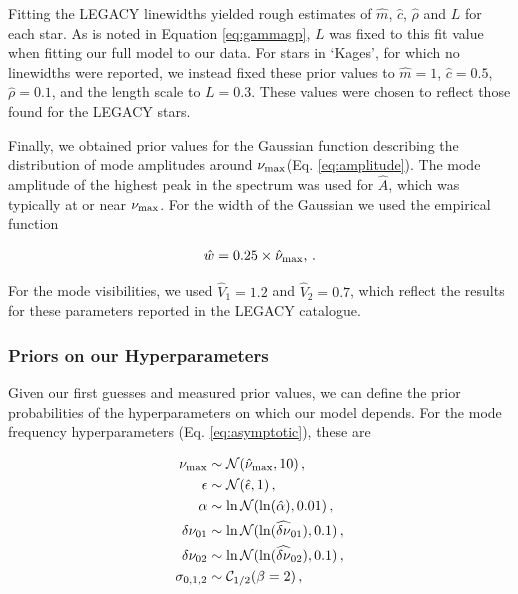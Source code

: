 \documentclass[12pt]{article}
\newcommand{\numax}{\mbox{$\nu_{\rm max}$}\xspace}
\begin{document}
Fitting the LEGACY linewidths yielded rough estimates of $\hat{m}$, $\hat{c}$, $\hat{\rho}$ and $L$ for each star. As is noted in Equation \ref{eq:gammagp}, $L$ was fixed to this fit value when fitting our full model to our data. For stars in `Kages', for which no linewidths were reported, we instead fixed these prior values to $\hat{m} = 1$, $\hat{c} = 0.5$, $\hat{\rho} = 0.1$, and the length scale to $L = 0.3$. These values were chosen to reflect those found for the LEGACY stars.

Finally, we obtained prior values for the Gaussian function describing the distribution of mode amplitudes around \numax (Eq. \ref{eq:amplitude}). The mode amplitude of the highest peak in the spectrum was used for $\hat{A}$, which was typically at or near \numax. For the width of the Gaussian we used the empirical function \cite{lund+2017}

\begin{equation}
	\hat{w} = 0.25 \times \hat{\nu}_{\rm max},\, .
\end{equation}

\noindent For the mode visibilities, we used $\hat{V}_1 = 1.2$ and $\hat{V}_2 = 0.7$, which reflect the results for these parameters reported in the LEGACY catalogue.

\subsubsection{Priors on our Hyperparameters}
Given our first guesses and measured prior values, we can define the prior probabilities of the hyperparameters on which our model depends. For the mode frequency hyperparameters (Eq. \ref{eq:asymptotic}), these are

\begin{equation}
	\begin{split}
		\numax &\sim \mathcal{N}(\hat{\nu}_{\rm max}, 10)\, ,\\
		\epsilon &\sim \mathcal{N}(\hat{\epsilon}, 1)\, ,\\
		\alpha &\sim \ln\mathcal{N}(\ln(\hat{\alpha}), 0.01)\, ,\\
		\delta\nu_{01} &\sim \ln\mathcal{N}(\ln(\widehat{\delta\nu}_{01}), 0.1)\, ,\\
		\delta\nu_{02} &\sim \ln\mathcal{N}(\ln(\widehat{\delta\nu}_{02}), 0.1)\, ,\\
		\sigma_{0,1,2} &\sim \mathcal{C}_{1/2}(\beta = 2)\, ,
	\end{split}
\end{equation}
\end{document}

